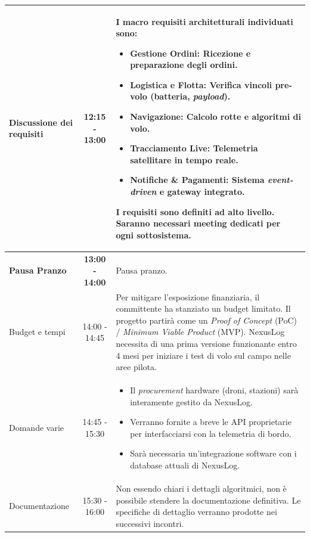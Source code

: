 \documentclass[12pt, a4paper]{article}
\begin{document}
\begin{longtable}{|>{\raggedright\arraybackslash}p{}|c|>{\raggedright\arraybackslash}p{}|}
\hline
Discussione dei requisiti & 12:15 - 13:00 & I macro requisiti architetturali individuati sono:
\begin{itemize}
    \item \textbf{Gestione Ordini:} Ricezione e preparazione degli ordini.
    \item \textbf{Logistica e Flotta:} Verifica vincoli pre-volo (batteria, \textit{payload}).
    \item \textbf{Navigazione:} Calcolo rotte e algoritmi di volo.
    \item \textbf{Tracciamento Live:} Telemetria satellitare in tempo reale.
    \item \textbf{Notifiche \& Pagamenti:} Sistema \textit{event-driven} e gateway integrato.
\end{itemize}
I requisiti sono definiti ad alto livello. Saranno necessari meeting dedicati per ogni sottosistema. \\
\hline
\textbf{Pausa Pranzo} & \textbf{13:00 - 14:00} & Pausa pranzo.\\
\hline
Budget e tempi & 14:00 - 14:45 & Per mitigare l'esposizione finanziaria, il committente ha stanziato un budget limitato. Il progetto partirà come un \textit{Proof of Concept} (PoC) / \textit{Minimum Viable Product} (MVP). \vspace{0.5em} \newline NexusLog necessita di una prima versione funzionante entro 4 mesi per iniziare i test di volo sul campo nelle aree pilota. \\
\hline
Domande varie & 14:45 - 15:30 & 
\begin{itemize}
    \item Il \textit{procurement} hardware (droni, stazioni) sarà interamente gestito da NexusLog.
    \item Verranno fornite a breve le API proprietarie per interfacciarsi con la telemetria di bordo.
    \item Sarà necessaria un'integrazione software con i database attuali di NexusLog.
\end{itemize} \\
\hline
Documentazione & 15:30 - 16:00 & Non essendo chiari i dettagli algoritmici, non è possibile stendere la documentazione definitiva. Le specifiche di dettaglio verranno prodotte nei successivi incontri. \\
\end{longtable}
\end{document}
